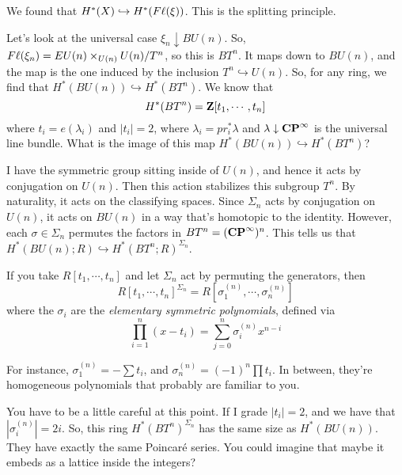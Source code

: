 We found that $H^\ast(X) \hookrightarrow H^\ast(F\ell(\xi))$.
This is the splitting principle.

Let's look at the universal case $\xi_n\downarrow BU(n)$.
So, $F\ell(\xi_n) = EU(n)\times_{U(n)} U(n)/T^n$, so this is $BT^n$.
It maps down to $BU(n)$, and the map is the one induced by the inclusion $T^n\hookrightarrow U(n)$.
So, for any ring, we find that $H^\ast(BU(n))\hookrightarrow H^\ast(BT^n)$.
We know that 
$$
H^\ast(BT^n) = \mathbf Z[t_1,\cdots,t_n]
$$
where $t_i = e(\lambda_i)$ and $|t_i| = 2$, where $\lambda_i = pr_i^\ast\lambda$ and $\lambda\downarrow \mathbf{CP}^\infty$ is the universal line bundle.
What is the image of this map $H^\ast(BU(n))\hookrightarrow H^\ast(BT^n)$?

I have the symmetric group sitting inside of $U(n)$, and hence it acts by conjugation on $U(n)$.
Then this action stabilizes this subgroup $T^n$.
By naturality, it acts on the classifying spaces.
Since $\Sigma_n$ acts by conjugation on $U(n)$, it acts on $BU(n)$ in a way that's homotopic to the identity.
However, each $\sigma\in \Sigma_n$ permutes the factors in $BT^n = (\mathbf{CP}^\infty)^n$.
This tells us that $H^\ast(BU(n);R) \hookrightarrow H^\ast(BT^n;R)^{\Sigma_n}$.
\begin{theorem}[Algebra]
    If you take $R[t_1,\cdots,t_n]$ and let $\Sigma_n$ act by permuting the generators, then
    $$
    R[t_1,\cdots,t_n]^{\Sigma_n} = R[\sigma_1^{(n)},\cdots,\sigma_n^{(n)}]
    $$
    where the $\sigma_i$ are the \emph{elementary symmetric polynomials}, defined via
    $$
    \prod^n_{i=1}(x-t_i) = \sum^n_{j=0} \sigma_i^{(n)}x^{n-i}
    $$
\end{theorem}
For instance, $\sigma_1^{(n)} = -\sum t_i$, and $\sigma_n^{(n)} = (-1)^n\prod t_i$.
In between, they're homogeneous polynomials that probably are familiar to you.

You have to be a little careful at this point.
If I grade $|t_i| = 2$, and we have that $|\sigma_i^{(n)}| = 2i$.
So, this ring $H^\ast(BT^n)^{\Sigma_n}$ has the same size as $H^\ast(BU(n))$.
They have exactly the same Poincar\'{e} series.
You could imagine that maybe it embeds as a lattice inside the integers?

